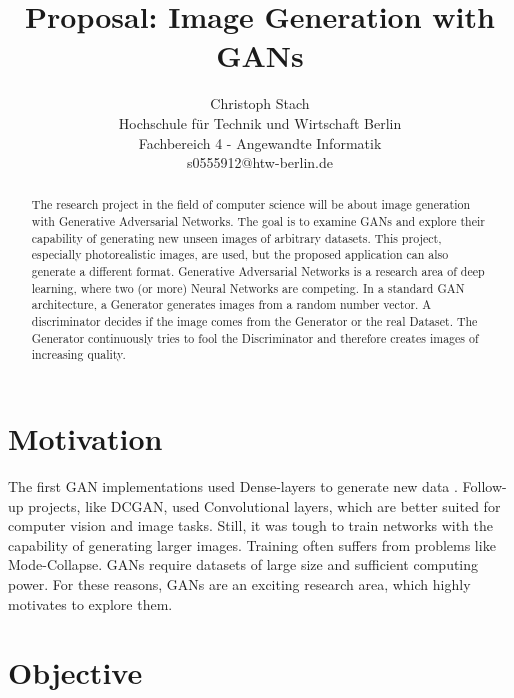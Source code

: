\documentclass[]{article}
\begin{document}
\title{\textbf{Proposal: Image Generation with GANs}}

\author{
  Christoph Stach\\
  Hochschule für Technik und Wirtschaft Berlin\\
  Fachbereich 4 - Angewandte Informatik\\
  s0555912@htw-berlin.de
}
\maketitle

\begin{abstract}

\noindent
The research project in the field of computer science will be about image generation with Generative Adversarial Networks. The goal is to examine GANs and explore their capability of generating new unseen images of arbitrary datasets. This project, especially photorealistic images, are used, but the proposed application can also generate a different format. Generative Adversarial Networks is a research area of deep learning, where two (or more) Neural Networks are competing. In a standard GAN architecture, a Generator generates images from a random number vector. A discriminator decides if the image comes from the Generator or the real Dataset. The Generator continuously tries to fool the Discriminator and therefore creates images of increasing quality.

\end{abstract}


\section{Motivation}

\noindent
The first GAN implementations used Dense-layers to generate new data \cite{goodfellow2014generative}. Follow-up projects, like DCGAN, \cite{radford2016unsupervised} used Convolutional layers, which are better suited for computer vision and image tasks. Still, it was tough to train networks with the capability of generating larger images. Training often suffers from problems like Mode-Collapse. GANs require datasets of large size and sufficient computing power. For these reasons, GANs are an exciting research area, which highly motivates to explore them.


\section{Objective}
\end{document}
